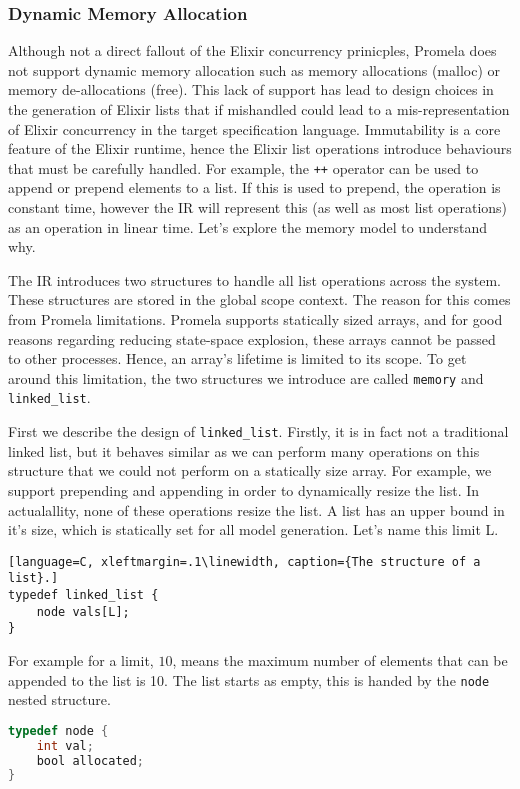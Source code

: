 \subsubsection{Dynamic Memory Allocation}
Although not a direct fallout of the Elixir concurrency prinicples, Promela does not support dynamic memory allocation such as memory allocations (malloc) or memory de-allocations (free). This lack of support has lead to design choices in the generation of Elixir lists that if mishandled could lead to a mis-representation of Elixir concurrency in the target specification language. Immutability is a core feature of the Elixir runtime, hence the Elixir list operations introduce behaviours that must be carefully handled. For example, the \texttt{++} operator can be used to append or prepend elements to a list. If this is used to prepend, the operation is constant time, however the IR will represent this (as well as most list operations) as an operation in linear time. Let's explore the memory model to understand why. 
\par
The IR introduces two structures to handle all list operations across the system. These structures are stored in the global scope context. The reason for this comes from Promela limitations. Promela supports statically sized arrays, and for good reasons regarding reducing state-space explosion, these arrays cannot be passed to other processes. Hence, an array's lifetime is limited to its scope. To get around this limitation, the two structures we introduce are called \texttt{memory} and \texttt{linked\_list}.
\par
First we describe the design of \texttt{linked\_list}. Firstly, it is in fact not a traditional linked list, but it behaves similar as we can perform many operations on this structure that we could not perform on a statically size array. For example, we support prepending and appending in order to dynamically resize the list. In actualallity, none of these operations resize the list. A list has an upper bound in it's size, which is statically set for all model generation. Let's name this limit L.
\begin{lstlisting}[language=C, xleftmargin=.1\linewidth, caption={The structure of a list}.]
typedef linked_list {
    node vals[L];
}
\end{lstlisting}
For example for a limit, $10$, means the maximum number of elements that can be appended to the list is 10. The list starts as empty, this is handed by the \texttt{node} nested structure.
\begin{lstlisting}[language=C, xleftmargin=.1\linewidth, caption={Example of an int list node.}]
typedef node {
    int val;
    bool allocated;
}
\end{lstlisting}
